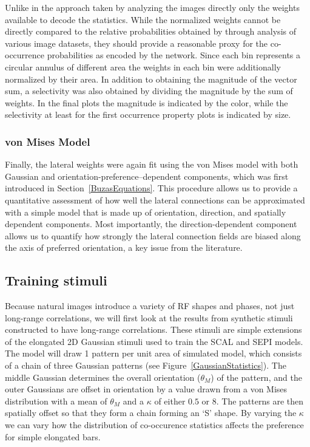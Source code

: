 Unlike in the approach taken by \cite{Geisler2001} analyzing the
images directly only the weights available to decode the statistics.
While the normalized weights cannot be directly compared to the
relative probabilities obtained by \cite{Geisler2001} through analysis
of various image datasets, they should provide a reasonable proxy for
the co-occurrence probabilities as encoded by the network. Since each
bin represents a circular annulus of different area the weights in
each bin were additionally normalized by their area. In addition to
obtaining the magnitude of the vector sum, a selectivity was also
obtained by dividing the magnitude by the sum of weights. In the final
plots the magnitude is indicated by the color, while the selectivity
at least for the first occurrence property plots is indicated by size.

\subsubsection*{von Mises Model}

Finally, the lateral weights were again fit using the von Mises model
with both Gaussian and orientation-preference--dependent components,
which was first introduced in Section~\ref{BuzasEquations}. This procedure
allows us to provide a quantitative assessment of how well the lateral
connections can be approximated with a simple model that is made up of
orientation, direction, and spatially dependent components. Most
importantly, the direction-dependent component allows us to quantify
how strongly the lateral connection fields are biased along the axis
of preferred orientation, a key issue from the literature.

\subsection{Training stimuli}
\label{synthetic}

Because natural images introduce a variety of RF shapes and phases,
not just long-range correlations, we will first look at the results
from synthetic stimuli constructed to have long-range correlations.
These stimuli are simple extensions of the
elongated 2D Gaussian stimuli used to train the SCAL and SEPI models.
The model will draw 1 pattern per unit area of simulated model, which consists of
a chain of three Gaussian patterns (see
Figure~\ref{GaussianStatistics}). The middle Gaussian determines the
overall orientation ($\theta_M$) of the pattern, and the outer
Gaussians are offset in orientation by a value drawn from a von Mises
distribution with a mean of $\theta_M$ and a $\kappa$ of either $0.5$
or $8$. The patterns are then spatially offset so that they form a
chain forming an `S' shape. By varying the $\kappa$ we can vary how
the distribution of co-occurence statistics affects the preference
for simple elongated bars.

